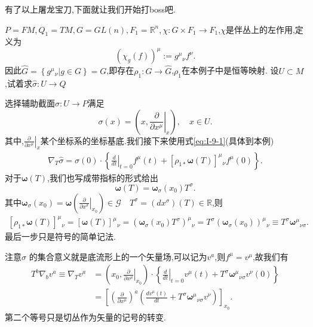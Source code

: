 \documentclass[../main.tex]{subfiles}
\begin{document}
有了以上屠龙宝刀,下面就让我们开始打boss吧.
\begin{example}
  \label{ex:I-9-1}
  $P = FM,Q_1 = TM,G = GL(n), F_1 = \mathbb{R}^n,\chi : G \times F_1 \to  F_1$,$\chi$是伴丛上的左作用,定义为 \[
    (\chi_g(f))^\mu := g^{\mu}{}_{\nu}f^\nu 
  .\] 
  因此$\hat{G} = \left\{ g^{\mu}{}_{\nu}| g\in G \right\} = G $,即存在$\rho_1:G\to \hat{G}$,$\rho_1$在本例子中是恒等映射.
  设$U \subset M$,试着求$\hat{\sigma}:U \to Q$
\end{example}
选择辅助截面$\sigma: U \to P$满足\[
\sigma(x) = (x, \left.\frac{\partial}{\partial x^\mu}\right|_{x} ), \quad x \in U 
.\] 
其中,$\left.\frac{\partial}{\partial x^\mu}\right|_{x}$某个坐标系的坐标基底.我们接下来使用式\ref{eq:I-9-1}(具体到本例)
  \begin{align*}
    \nabla_T \hat{\sigma} = \sigma(0)  \cdot \left\{ \left.\frac{d}{dt}\right|_{t = 0} f^\mu(t)  + \left[ \rho_{1*} \bm{\omega}(T) \right]^{\mu}{}_{\nu} f^\mu(0)\right\}  
  .\end{align*}
  对于$\bm{\omega}(T) $,我们也写成带指标的形式给出\[
 \bm{\omega}(T) = \bm{\omega}_\sigma(x_0)T^\sigma   
  .\] 
  其中$\bm{\omega}_\sigma(x_0) = \bm{\omega} (\left.\frac{\partial}{\partial x^\sigma}\right|_{x_0}) \in \mathscr{G} \quad T^\sigma = (dx^\sigma)(T) \in \mathbb{R}$,则
    \begin{align*}
      \left[ \rho_{1*} \bm{\omega}(T) \right]^{\mu}{}_{\nu} = [\bm{\omega}(T)]^{\mu}{}_{\nu} = (\bm{\omega}_\sigma(x_0) T^\sigma )^{\mu}{}_{\nu} = T^\sigma (\bm{\omega}_\sigma(x_0) )^{\mu}{}_{\nu} \equiv T^\sigma \bm{\omega}^{\mu}{}_{\nu \sigma} 
    .\end{align*}
    最后一步只是符号的简单记法.
    
    注意$\hat{\sigma}$ 的集合意义就是底流形上的一个矢量场,可以记为$v^a$,则$f^\mu = v^\mu$,故我们有
     \begin{align*}
       T^b \nabla_b v^a \equiv \nabla _T v^a &= (x_0,\left.\frac{\partial}{\partial x^\mu}\right|_{x_0} ) \cdot \left\{\left.\frac{d}{dt}\right|_{t = 0} v^\mu(t)  + T^\sigma \bm{\omega}^{\mu}{}_{\nu\sigma}  v^\nu(0) \right\}  \\
                                             & =\left[ \left( \frac{\partial}{\partial x^\mu} \right)^a \left( \frac{d v^\mu(t)}{dt}   + T^\sigma \bm{\omega}^{\mu}{}_{\nu\sigma} v^\nu \right)  \right]_{x_0}
    .\end{align*}
    第二个等号只是切丛作为矢量的记号的转变.
\end{document}
